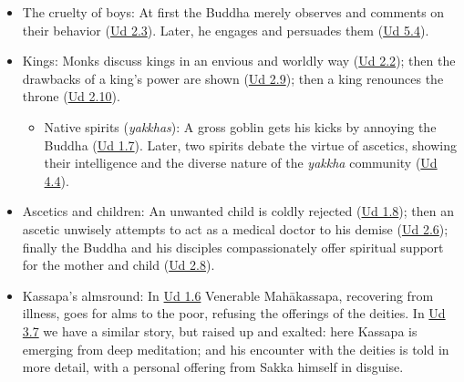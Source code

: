 \documentclass[12pt,openany]{book}%
\begin{document}
\begin{itemize}%
\item The cruelty of boys: At first the Buddha merely observes and comments on their behavior (\href{https://suttacentral.net/ud2.3/en/sujato}{Ud 2.3}). Later, he engages and persuades them (\href{https://suttacentral.net/ud5.4/en/sujato}{Ud 5.4}).%
\item Kings: Monks discuss kings in an envious and worldly way (\href{https://suttacentral.net/ud2.2/en/sujato}{Ud 2.2}); then the drawbacks of a king’s power are shown (\href{https://suttacentral.net/ud2.9/en/sujato}{Ud 2.9}); then a king renounces the throne (\href{https://suttacentral.net/ud2.10/en/sujato}{Ud 2.10}).\begin{itemize}%
\item Native spirits (\textit{yakkhas}): A gross goblin gets his kicks by annoying the Buddha (\href{https://suttacentral.net/ud1.7/en/sujato}{Ud 1.7}). Later, two spirits debate the virtue of ascetics, showing their intelligence and the diverse nature of the \textit{yakkha} community (\href{https://suttacentral.net/ud4.4/en/sujato}{Ud 4.4}).%
\end{itemize}

%
\item Ascetics and children: An unwanted child is coldly rejected (\href{https://suttacentral.net/ud1.8/en/sujato}{Ud 1.8}); then an ascetic unwisely attempts to act as a medical doctor to his demise (\href{https://suttacentral.net/ud2.6/en/sujato}{Ud 2.6}); finally the Buddha and his disciples compassionately offer spiritual support for the mother and child (\href{https://suttacentral.net/ud2.8/en/sujato}{Ud 2.8}).%
\item Kassapa’s almsround: In \href{https://suttacentral.net/ud1.6/en/sujato}{Ud 1.6}  Venerable \textsanskrit{Mahākassapa}, recovering from illness, goes for alms to the poor, refusing the offerings of the deities. In \href{https://suttacentral.net/ud3.7/en/sujato}{Ud 3.7}  we have a similar story, but raised up and exalted: here Kassapa is emerging from deep meditation; and his encounter with the deities is told in more detail, with a personal offering from Sakka himself in disguise.%
\end{itemize}
\end{document}
